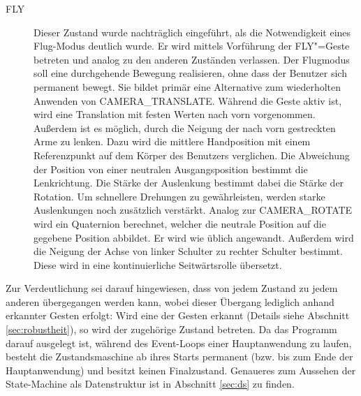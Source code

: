 \begin{description}
		\item[FLY] Dieser Zustand wurde nachträglich eingeführt, als die Notwendigkeit eines Flug-Modus deutlich wurde. Er wird mittels Vorführung der FLY"=Geste betreten und analog zu den anderen Zuständen verlassen. Der Flugmodus soll eine durchgehende Bewegung realisieren, ohne dass der Benutzer sich permanent bewegt. Sie bildet primär eine Alternative zum wiederholten Anwenden von CAMERA\_TRANSLATE. Während die Geste aktiv ist, wird eine Translation mit festen Werten nach vorn vorgenommen. Außerdem ist es möglich, durch die Neigung der nach vorn gestreckten Arme zu lenken. Dazu wird die mittlere Handposition mit einem Referenzpunkt auf dem Körper des Benutzers verglichen. Die Abweichung der Position von einer neutralen Ausgangsposition bestimmt die Lenkrichtung. Die Stärke der Auslenkung bestimmt dabei die Stärke der Rotation. Um schnellere Drehungen zu gewährleisten, werden starke Auslenkungen noch zusätzlich verstärkt. Analog zur CAMERA\_ROTATE wird ein Quaternion berechnet, welcher die neutrale Position auf die gegebene Position abbildet. Er wird wie üblich angewandt. Außerdem wird die Neigung der Achse von linker Schulter zu rechter Schulter bestimmt. Diese wird in eine kontinuierliche Seitwärtsrolle übersetzt.
	\end{description}
	Zur Verdeutlichung sei darauf hingewiesen, dass von jedem Zustand zu jedem anderen übergegangen werden kann, wobei dieser Übergang lediglich anhand erkannter Gesten erfolgt: Wird eine der Gesten erkannt (Details siehe Abschnitt \ref{sec:robustheit}), so wird der zugehörige Zustand betreten. Da das Programm darauf ausgelegt ist, während des Event-Loops einer Hauptanwendung zu laufen, besteht die Zustandsmaschine ab ihres Starts permanent (bzw. bis zum Ende der Hauptanwendung) und besitzt keinen Finalzustand. Genaueres zum Aussehen der State-Machine als Datenstruktur ist in Abschnitt \ref{sec:ds} zu finden.

